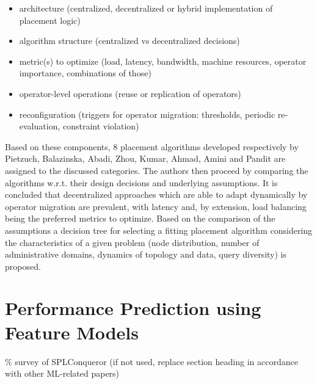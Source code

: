 \begin{itemize}
\item architecture (centralized, decentralized or hybrid implementation of placement logic)
\item algorithm structure (centralized vs decentralized decisions)
\item metric(s) to optimize (load, latency, bandwidth, machine resources, operator importance, combinations of those)
\item operator-level operations (reuse or replication of operators) 
\item reconfiguration (triggers for operator migration: thresholds, periodic re-evaluation, constraint violation)
\end{itemize}

Based on these components, 8 placement algorithms developed r\gls{esp}ectively by Pietzuch, Balazinska, Abadi, Zhou, Kumar, Ahmad, Amini and Pandit are assigned to the discussed categories. The authors then proceed by comparing the algorithms w.r.t. their design decisions and underlying assumptions. It is concluded that decentralized approaches which are able to adapt dynamically by operator migration are prevalent, with latency and, by extension, load balancing being the preferred metrics to optimize. 
Based on the comparison of the assumptions a decision tree for selecting a fitting placement algorithm considering the characteristics of a given problem (node distribution, number of administrative domains, dynamics of topology and data, query diversity) is proposed.


\section{Performance Prediction using Feature Models}
\% survey of SPLConqueror (if not used, replace section heading in accordance with other ML-related papers)

